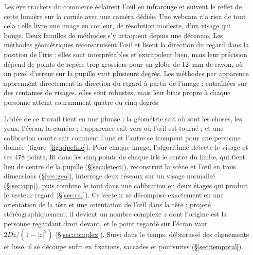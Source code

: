 \documentclass[10pt,a4paper]{article}
\begin{document}
Les eye trackers du commerce éclairent l'œil en infrarouge et suivent le reflet de cette lumière sur la cornée avec une caméra dédiée. Une webcam n'a rien de tout cela : elle livre une image en couleur, de résolution modeste, d'un visage qui bouge. Deux familles de méthodes s'y attaquent depuis une décennie. Les méthodes géométriques reconstruisent l'œil et lisent la direction du regard dans la position de l'iris ; elles sont interprétables et extrapolent bien, mais leur précision dépend de points de repère trop grossiers pour un globe de 12~mm de rayon, où un pixel d'erreur sur la pupille vaut plusieurs degrés. Les méthodes par apparence \cite{krafka2016} apprennent directement la direction du regard à partir de l'image ; entraînées sur des centaines de visages, elles sont robustes, mais leur biais propre à chaque personne atteint couramment quatre ou cinq degrés.

L'idée de ce travail tient en une phrase : la géométrie sait où sont les choses, les yeux, l'écran, la caméra ; l'apparence sait vers où l'œil est tourné ; et une calibration courte sait comment l'une et l'autre se trompent pour une personne donnée (figure~\ref{fig:pipeline}). Pour chaque image, l'algorithme détecte le visage et ses 478 points, lit dans les cinq points de chaque iris le centre du limbe, qui tient lieu de centre de la pupille (§\ref{sec:detect}), reconstruit la scène et l'œil en trois dimensions (§\ref{sec:geo}), interroge deux réseaux sur un visage normalisé (§\ref{sec:app}), puis combine le tout dans une calibration en deux étages qui produit le vecteur regard (§\ref{sec:cal}). Ce vecteur se décompose exactement en une orientation de la tête et une orientation de l'œil dans la tête ; projeté stéréographiquement, il devient un nombre complexe $z$ dont l'origine est la personne regardant droit devant, et le point regardé sur l'écran vaut $2Dz/(1-|z|^2)$ (§\ref{sec:complex}). Suivi dans le temps, débarrassé des clignements et lissé, il se découpe enfin en fixations, saccades et poursuites (§\ref{sec:temporal}).
\end{document}
